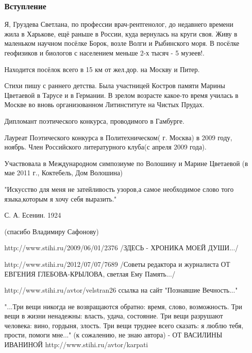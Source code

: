  
 
 

\subsubsection{Вступление}
\label{sec:poetry.rus.svetlana_gruzdeva.intro}


Я, Груздева Светлана, по профессии врач-рентгенолог, до недавнего времени жила
в Харькове, ещё раньше в России, куда вернулась на круги своя. Живу в маленьком
научном посёлке Борок, возле Волги и Рыбинского моря. В посёлке геофизиков и
биологов с населением меньше 2-х тысяч - 5 музеев!.

Находится посёлок всего в 15 км от жел.дор. на Москву и Питер.

Стихи пишу с раннего детства. Была участницей Костров памяти Марины Цветаевой в
Тарусе и в Германии. В зрелом возрасте какое-то время училась в Москве во вновь
организованном Литинституте на Чистых Прудах.  

Дипломант поэтического конкурса, проводимого в Гамбурге.

Лауреат Поэтического конкурса в Политехническом( г. Москва) в 2009 году,
ноябрь.  Член Российского литературного клуба(с апреля 2009 года).

Участвовала в Международном симпозиуме по Волошину и Марине Цветаевой (в мае
2011 г., Коктебель, Дом Волошина)

"Искусство для меня не затейливость узоров,а самое необходимое слово того
языка,которым я хочу себя выразить."

С. А. Есенин. 1924

(спасибо Владимиру Сафонову)

http://www.stihi.ru/2009/06/01/2376
/ЗДЕСЬ - ХРОНИКА МОЕЙ ДУШИ.../

http://www.stihi.ru/2012/07/07/7689
/Советы редактора и журналиста ОТ ЕВГЕНИЯ ГЛЕБОВА-КРЫЛОВА, светлая Ему Память.../

http://www.stihi.ru/avtor/velstran26
ссылка на сайт "Познавшие Вечность..."

"...Три вещи никогда не возвращаются обратно: время, слово, возможность. Три вещи в жизни ненадежны: власть, удача, состояние.
Три вещи разрушают человека: вино, гордыня, злость. Три вещи труднее всего сказать: я люблю тебя, прости, помоги мне..." (к сожалению, не знаю автора) - ОТ ВАСИЛИНЫ ИВАНИНОЙ http://www.stihi.ru/avtor/karpati

